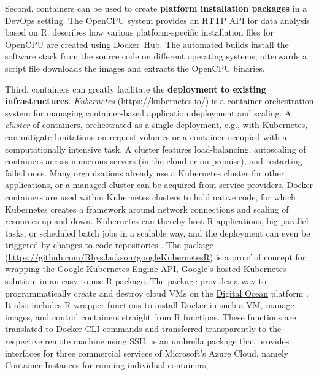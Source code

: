 Second, containers can be used to create \textbf{platform installation
packages} in a DevOps setting. The
\href{https://www.opencpu.org/}{OpenCPU} system provides an HTTP API for
data analysis based on R. \citet{ooms_opencpu_2017} describes how
various platform-specific installation files for OpenCPU are created
using Docker~Hub. The automated builds install the software stack from
the source code on different operating systems; afterwards a script file
downloads the images and extracts the OpenCPU binaries.

Third, containers can greatly facilitate the \textbf{deployment to
existing infrastructures}. \emph{Kubernetes}
(\url{https://kubernetes.io/}) is a container-orchestration system for
managing container-based application deployment and scaling. A
\emph{cluster} of containers, orchestrated as a single deployment, e.g.,
with Kubernetes, can mitigate limitations on request volumes or a
container occupied with a computationally intensive task. A cluster
features load-balancing, autoscaling of containers across numerous
servers (in the cloud or on premise), and restarting failed ones. Many
organisations already use a Kubernetes cluster for other applications,
or a managed cluster can be acquired from service providers. Docker
containers are used within Kubernetes clusters to hold native code, for
which Kubernetes creates a framework around network connections and
scaling of resources up and down. Kubernetes can thereby host R
applications, big parallel tasks, or scheduled batch jobs in a scalable
way, and the deployment can even be triggered by changes to code
repositories \citep[i.e., CD, see][]{edmondson_r_2018}. The package
(\url{https://github.com/RhysJackson/googleKubernetesR}) is a proof of
concept for wrapping the Google Kubernetes Engine API, Google's hosted
Kubernetes solution, in an easy-to-use R package. The package
 provides a way to programmatically create and
destroy cloud VMs on the \href{https://www.digitalocean.com/}{Digital
Ocean} platform \citep{analogsea_2019}. It also includes R wrapper
functions to install Docker in such a VM, manage images, and control
containers straight from R functions. These functions are translated to
Docker CLI commands and transferred transparently to the respective
remote machine using SSH.  is an umbrella package
that provides interfaces for three commercial services of Microsoft's
Azure Cloud, namely
\href{https://azure.microsoft.com/en-us/services/container-instances/}{Container
Instances} for running individual containers,
